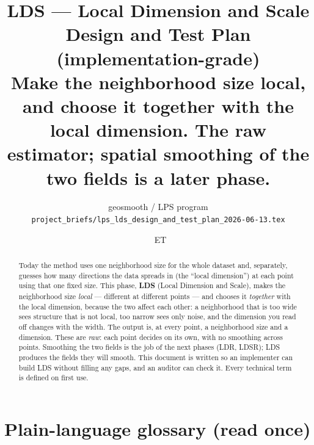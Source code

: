 \documentclass[11pt]{article}
\title{\textbf{LDS --- Local Dimension and Scale}\\[3pt]
\large Design and Test Plan (implementation-grade)\\[5pt]
\normalsize Make the neighborhood size local, and choose it together with the local
dimension. The raw estimator; spatial smoothing of the two fields is a later phase.}
\author{\small geosmooth / LPS program\\[2pt]
\footnotesize \nolinkurl{project_briefs/lps_lds_design_and_test_plan_2026-06-13.tex}}
\date{\DTMnow\ \textnormal{\footnotesize ET}}
\begin{document}
\maketitle

\begin{abstract}\noindent
Today the method uses one neighborhood size for the whole dataset and, separately,
guesses how many directions the data spreads in (the ``local dimension'') at each
point using that one fixed size. This phase, \textbf{LDS} (Local Dimension and
Scale), makes the neighborhood size \emph{local} --- different at different points
--- and chooses it \emph{together} with the local dimension, because the two affect
each other: a neighborhood that is too wide sees structure that is not local, too
narrow sees only noise, and the dimension you read off changes with the width. The
output is, at every point, a neighborhood size and a dimension. These are
\emph{raw}: each point decides on its own, with no smoothing across points. Smoothing
the two fields is the job of the next phases (LDR, LDSR); LDS produces the fields they
will smooth. This document is written so an implementer can build LDS without filling
any gaps, and an auditor can check it. Every technical term is defined on first use.
\end{abstract}

{\small\tableofcontents}

\section{Plain-language glossary (read once)}\label{sec:glossary}
\end{document}
